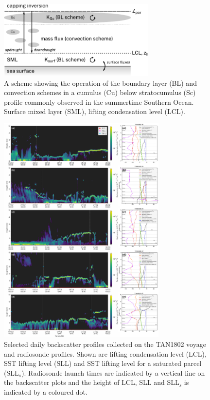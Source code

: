 \clearpage

\begin{figure}[t]
\centering
\includegraphics[width=0.7\textwidth]{chapter4/fig/scheme.pdf}
\caption[A scheme showing the operation of the boundary layer and convection schemes]{A scheme showing the operation of the boundary layer (BL)
and convection schemes in a cumulus (Cu) below stratocumulus (Sc) profile
commonly observed in the summertime Southern Ocean. Surface mixed layer (SML),
lifting condensation level (LCL).
}
\label{fig:scheme}
\end{figure}

\clearpage

\begin{figure}[t]
\centering
\includegraphics[width=0.75\textwidth]{chapter4/fig/backscatter_rs.pdf}
\caption[Selected daily backscatter profiles collected on the TAN1802 voyage
and radiosonde profiles]{Selected daily backscatter profiles collected on the TAN1802 voyage
and radiosonde profiles. Shown are lifting condensation level (LCL),
SST lifting level (SLL) and SST lifting level for a saturated parcel (SLL$_s$).
Radiosonde launch times are indicated by a vertical line on the backscatter
plots and the height of LCL, SLL and SLL$_s$ is indicated by a coloured dot.
}
\label{fig:backscatter-rs}
\end{figure}

